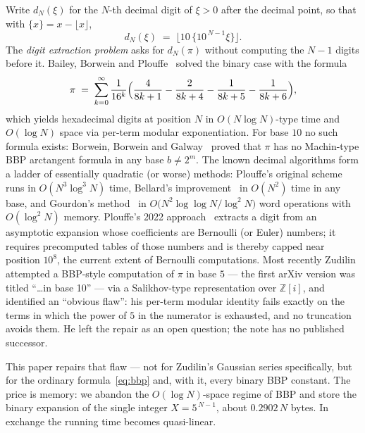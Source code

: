 \documentclass[11pt]{article}
\theoremstyle{remark}
\theoremstyle{definition}
\newcommand{\frc}[1]{\{#1\}}
\newcommand{\fl}[1]{\lfloor #1\rfloor}
\begin{document}
Write $d_N(\xi)$ for the $N$-th decimal digit of $\xi>0$ after the decimal
point, so that with $\frc{x}=x-\fl{x}$,
\begin{equation}\label{eq:digit}
d_N(\xi) \;=\; \bigl\lfloor 10\,\frc{10^{\,N-1}\xi}\bigr\rfloor .
\end{equation}
The \emph{digit extraction problem} asks for $d_N(\pi)$ without computing the
$N-1$ digits before it. Bailey, Borwein and Plouffe~\cite{BBP97} solved the
binary case with the formula
\begin{equation}\label{eq:bbp}
\pi \;=\; \sum_{k=0}^{\infty}\frac{1}{16^{k}}
\Bigl(\frac{4}{8k+1}-\frac{2}{8k+4}-\frac{1}{8k+5}-\frac{1}{8k+6}\Bigr),
\end{equation}
which yields hexadecimal digits at position $N$ in $O(N\log N)$-type time and
$O(\log N)$ space via per-term modular exponentiation. For base $10$ no such
formula exists: Borwein, Borwein and Galway~\cite{BBG04} proved that $\pi$ has
no Machin-type BBP arctangent formula in any base $b\neq 2^{m}$. The known
decimal algorithms form a ladder of essentially quadratic (or worse) methods:
Plouffe's original scheme~\cite{Plouffe96} runs in $O(N^{3}\log^{3}N)$ time,
Bellard's improvement~\cite{Bellard97} in $O(N^{2})$ time in any base, and
Gourdon's method~\cite{Gourdon03} in $O\!\bigl(N^{2}\log\log N/\log^{2}N\bigr)$
word operations with $O(\log^{2}N)$ memory. Plouffe's 2022
approach~\cite{Plouffe22} extracts a digit from an asymptotic expansion whose
coefficients are Bernoulli (or Euler) numbers; it requires precomputed tables
of those numbers and is thereby capped near position $10^{8}$, the current
extent of Bernoulli computations. Most recently
Zudilin~\cite{Zudilin24} attempted a BBP-style computation of $\pi$ in base
$5$ --- the first arXiv version was titled ``\ldots in base 10'' --- via a
Salikhov-type representation over $\mathbb{Z}[i]$, and identified an
``obvious flaw'': his per-term modular identity fails exactly on the terms in
which the power of $5$ in the numerator is exhausted, and no truncation
avoids them. He left the repair as an open question; the note has no
published successor.

This paper repairs that flaw --- not for Zudilin's Gaussian series
specifically, but for the ordinary formula~\eqref{eq:bbp} and, with it, every
binary BBP constant. The price is memory: we abandon the $O(\log N)$-space
regime of BBP and store the binary expansion of the single integer
$X=5^{\,N-1}$, about $0.2902\,N$ bytes. In exchange the running time becomes
quasi-linear.
\end{document}
